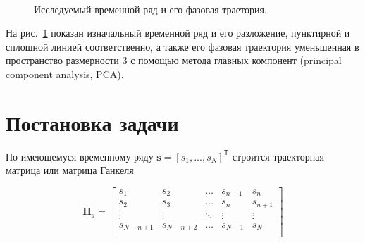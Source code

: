 \documentclass[12pt,twoside]{article}
\begin{document}
\begin{figure}[h]
\centering
  \\
\caption{Исследуемый временной ряд и его фазовая траетория. }
\label{fg:initial_traj}
\end{figure}

На рис.~\ref{fg:initial_traj} показан изначальный временной ряд и его разложение, пунктирной и сплошной линией соответственно, а также его фазовая траектория уменьшенная в пространство размерности 3 с помощью метода главных компонент (principal component analysis, PCA).

\section{Постановка задачи}
По имеющемуся временному ряду $\mathbf{s}=[s_1,...,s_N]^{\mathsf{T}}$ строится траекторная матрица или матрица Ганкеля

\begin{equation}
\mathbf{H_{s}} = 
\begin{bmatrix} 
	s_{1} & s_{2} & \ldots &s_{n-1} &s_{n}\\
	s_{2} & s_{3} & \ldots &s_{n} &s_{n+1}\\
	\vdots& \vdots & \ddots & \vdots & \vdots\\
	s_{N-n+1} & s_{N-n+2} &\ldots&s_{N-1} &s_{N}\\
\end{bmatrix}
\label{eq:hankel_matrix}
\end{equation}
                   
\end{document}
